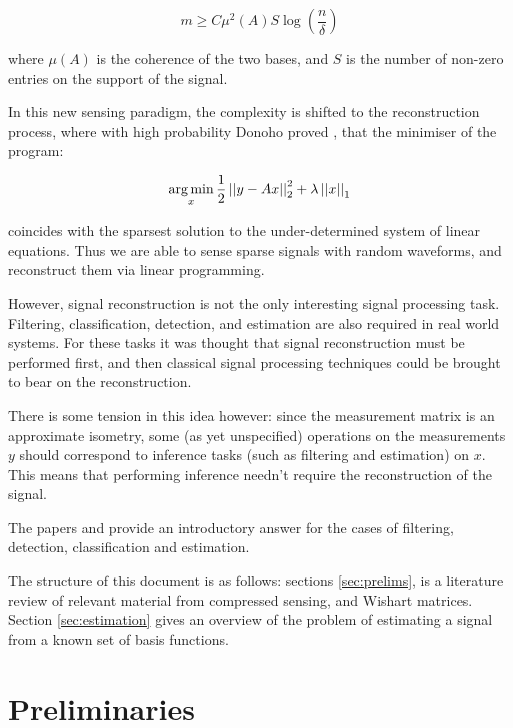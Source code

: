 \documentclass{article}
\begin{document}
\begin{equation}
m \geq C \mu^2(A) S \log\left(\frac{n}{\delta}\right)
\end{equation}
\label{minsamples}

where \( \mu(A)\) is the coherence of the two bases, and \(S\) is the number of non-zero entries on the support of the signal. 

In this new sensing paradigm, the complexity is shifted to the reconstruction process, where with high probability Donoho proved \cite{donoho2004neighborly}, that the minimiser of the program:

\begin{equation}
\operatorname*{arg\,min}_{x} \frac{1}{2}\left|\left|y-Ax\right|\right|_2^2 + \lambda\left|\left|x\right|\right|_1
\end{equation}

coincides with the sparsest solution to the under-determined system of linear equations. Thus we are able to sense sparse signals with random waveforms, and reconstruct them via linear programming.

However, signal reconstruction is not the only interesting signal processing task. Filtering, classification, detection, and estimation are also required in real world systems. For these tasks it was thought that signal reconstruction must be performed first, and then classical signal processing techniques could be brought to bear on the reconstruction. 

There is some tension in this idea however: since the measurement matrix is an approximate isometry, some (as yet unspecified) operations on the measurements \(y\) should correspond to inference tasks (such as filtering and estimation) on \(x\). This means that performing inference needn’t require the reconstruction of the signal. 

The papers \cite{davenport2010signal} and \cite{davenport2007smashed} provide an introductory answer for the cases of filtering, detection, classification and estimation.

The structure of this document is as follows: sections \eqref{sec:prelims}, is a literature review of relevant material from compressed sensing, and Wishart matrices. Section \eqref{sec:estimation} gives an overview of the problem of estimating a signal from a known set of basis functions. 

\section{Preliminaries} \label{sec:prelims}
\end{document}
